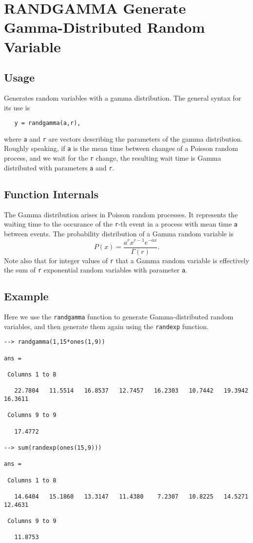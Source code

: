 \section{RANDGAMMA Generate Gamma-Distributed Random Variable}

\subsection{Usage}

Generates random variables with a gamma distribution.  The general
syntax for its use is
\begin{verbatim}
   y = randgamma(a,r),
\end{verbatim}
where \verb|a| and \verb|r| are vectors describing the parameters of the
gamma distribution.  Roughly speaking, if \verb|a| is the mean time between
changes of a Poisson random process, and we wait for the \verb|r| change,
the resulting wait time is Gamma distributed with parameters \verb|a| 
and \verb|r|.
\subsection{Function Internals}

The Gamma distribution arises in Poisson random processes.  It represents
the waiting time to the occurance of the \verb|r|-th event in a process with
mean time \verb|a| between events.  The probability distribution of a Gamma
random variable is
\[
   P(x) = \frac{a^r x^{r-1} e^{-ax}}{\Gamma(r)}.
\]
Note also that for integer values of \verb|r| that a Gamma random variable
is effectively the sum of \verb|r| exponential random variables with parameter
\verb|a|.
\subsection{Example}

Here we use the \verb|randgamma| function to generate Gamma-distributed
random variables, and then generate them again using the \verb|randexp|
function.
\begin{verbatim}
--> randgamma(1,15*ones(1,9))

ans = 

 Columns 1 to 8

   22.7804   11.5514   16.8537   12.7457   16.2303   10.7442   19.3942   16.3611 

 Columns 9 to 9

   17.4772 

--> sum(randexp(ones(15,9)))

ans = 

 Columns 1 to 8

   14.6404   15.1860   13.3147   11.4380    7.2307   10.8225   14.5271   12.4631 

 Columns 9 to 9

   11.8753 
\end{verbatim}
